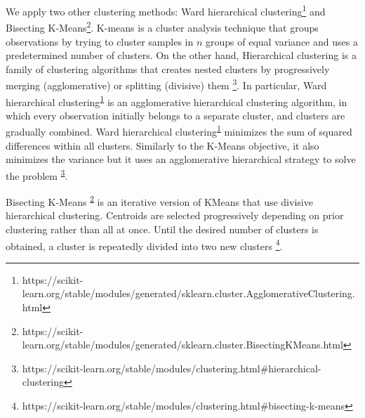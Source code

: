         We apply two other clustering methods: Ward hierarchical clustering\footnote{https://scikit-learn.org/stable/modules/generated/sklearn.cluster.AgglomerativeClustering.html\label{scklearn:Ward}} 
        and Bisecting K-Means\footnote{https://scikit-learn.org/stable/modules/generated/sklearn.cluster.BisectingKMeans.html\label{bisecting}}. K-means is a cluster analysis technique that groups observations by trying to cluster samples in $n$ groups of equal variance and uses a predetermined number of clusters. On the other hand, Hierarchical clustering is a family of clustering algorithms that creates nested clusters by progressively merging (agglomerative) or splitting (divisive) them \footnote{https://scikit-learn.org/stable/modules/clustering.html\#hierarchical-clustering\label{scklearn:hierarchical_clustering}}.
        In particular, Ward hierarchical clustering\textsuperscript{\ref{scklearn:Ward}} is an agglomerative hierarchical clustering algorithm, in which every observation initially belongs to a separate cluster, and clusters are gradually combined. Ward hierarchical clustering\textsuperscript{\ref{scklearn:Ward}} minimizes the sum of squared differences within all clusters. Similarly to the K-Means objective, it also minimizes the variance but it uses an agglomerative hierarchical strategy to solve the problem \textsuperscript{\ref{scklearn:hierarchical_clustering}}.
        
        Bisecting K-Means \textsuperscript{\ref{bisecting}} is an iterative version of KMeans that use divisive hierarchical clustering. Centroids are selected progressively depending on prior clustering rather than all at once. Until the desired number of clusters is obtained, a cluster is repeatedly divided into two new clusters \footnote{https://scikit-learn.org/stable/modules/clustering.html\#bisecting-k-means}.

